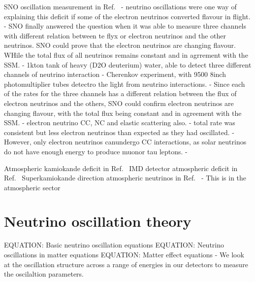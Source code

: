 SNO oscillation measurement in Ref.~\cite{ahmad2002}
- neutrino oscillations were one way of explaining this deficit if some of the electron neutrinos converted flavour in flight.
- SNO finally answered the question when it was able to measure three channels with different relation between te flyx or electron neutrinos and the other neutrinos. SNO could prove that the electron neutrinos are changing flavour. WHile the total flux of all neutrinos remains constant and in agrrement with the SSM.
- 1kton tank of heavy (D2O deuterium) water, able to detect three different channels of neutrino interaction
- Cherenkov experiment, with 9500 8inch photomultiplier tubes detectro the light from neutrino interactions.
- Since each of the rates for the three channels has a different relation between the flux of electron neutrinos and the others, SNO could confirm electron neutrinos are changing flavour, with the total flux being constant and in agreement with the SSM.
- electron neutrino CC, NC and elastic scattering also.
- total rate was consistent but less electron neutrinos than expected as they had oscillated.
- However, only electron neutrinos canundergo CC interactions, as solar neutrinos do not have enough energy to produce muonor tau leptons.
- %

Atmospheric kamiokande deficit in Ref.~\cite{hirata1988}
IMD detector atmospheric deficit in Ref.~\cite{becker1992}
Superkamiokande direction atmospheric neutrinos in Ref.~\cite{becker1992}
- This is in the atmospheric sector

\section{Neutrino oscillation theory}
\label{sec:theory_theory}

EQUATION: Basic neutrino oscillation equations
EQUATION: Neutrino oscillations in matter equations
EQUATION: Matter effect equations
- We look at the oscillation structure across a range of energies in our detectors to measure the oscilaltion parameters.

